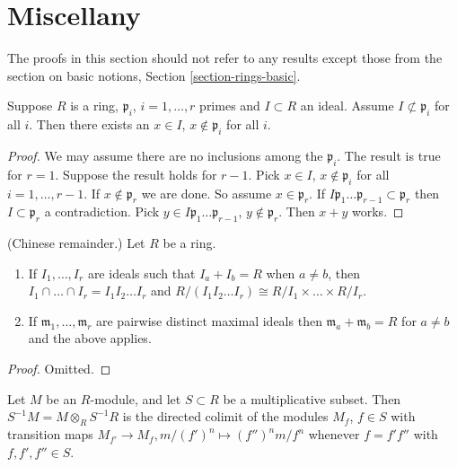 \section{Miscellany}
\label{section-miscellany}

\noindent
The proofs in this section should not refer to any results except
those from the section on basic notions, Section \ref{section-rings-basic}.

\begin{lemma}
\label{lemma-silly}
Suppose $R$ is a ring, $\mathfrak p_i$, $i=1,\ldots,r$ primes
and $I \subset R$ an ideal. Assume $I \not\subset \mathfrak p_i$
for all $i$. Then there exists an $x\in I$, $x\not\in \mathfrak p_i$ for
all $i$.
\end{lemma}

\begin{proof}
We may assume there are no inclusions among the $\mathfrak p_i$.
The result is true for $r = 1$.
Suppose the result holds for $r-1$.
Pick $x \in I$, $x \not \in \mathfrak p_i$ for all $i=1,\ldots,r-1$.
If $x \not\in \mathfrak p_r$ we are done. So assume $x \in \mathfrak p_r$.
If $I\mathfrak p_1 \ldots \mathfrak p_{r-1} \subset \mathfrak p_r$
then $I \subset \mathfrak p_r$ a contradiction.
Pick $y \in I\mathfrak p_1 \ldots \mathfrak p_{r-1}$,
$y \not \in \mathfrak p_r$. Then $x+y$ works.
\end{proof}

\begin{lemma}
\label{lemma-chinese-remainder}
(Chinese remainder.)
Let $R$ be a ring.
\begin{enumerate}
\item If $I_1,\ldots,I_r$ are ideals such that $I_a + I_b = R$
when $a \not = b$, then $I_1 \cap \ldots \cap I_r = 
I_1I_2\ldots I_r$ and $R/(I_1I_2\ldots I_r)
\cong R/I_1 \times \ldots \times R/I_r$.
\item If $\mathfrak m_1,\ldots,\mathfrak m_r$ are pairwise distinct maximal
ideals then $\mathfrak m_a + \mathfrak m_b = R$ for $a \not=b$ and the
above applies.
\end{enumerate}
\end{lemma}

\begin{proof}
Omitted.
\end{proof}

\begin{lemma}
\label{lemma-localize-colimit}
Let $M$ be an $R$-module, and let $S \subset R$ be
a multiplicative subset. Then $S^{-1}M = M\otimes_R S^{-1}R$
is the directed colimit of the modules $M_f$, $f\in S$ with
transition maps $M_{f'} \to M_f, m/(f')^n \mapsto (f'')^n m/f^n$
whenever $f = f' f''$ with $f,f',f''\in S$.
\end{lemma}

